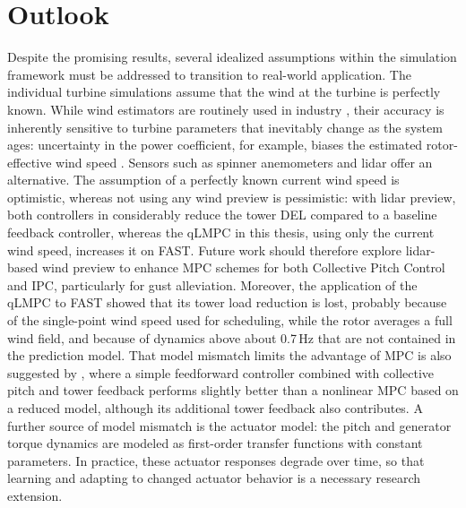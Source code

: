\section{Outlook} \label{sec:Outlook}

Despite the promising results, several idealized assumptions within the simulation framework must be addressed to transition to real-world application. The individual turbine simulations assume that the wind at the turbine is perfectly known. While wind estimators are routinely used in industry \cite{soltani2013estimation}, their accuracy is inherently sensitive to turbine parameters that inevitably change as the system ages: uncertainty in the power coefficient, for example, biases the estimated rotor-effective wind speed \cite{brandetti2022ill}. Sensors such as spinner anemometers and lidar offer an alternative. The assumption of a perfectly known current wind speed is optimistic, whereas not using any wind preview is pessimistic: with lidar preview, both controllers in \cite{schlipf2012comparison} considerably reduce the tower DEL compared to a baseline feedback controller, whereas the qLMPC in this thesis, using only the current wind speed, increases it on FAST. Future work should therefore explore lidar-based wind preview to enhance MPC schemes for both Collective Pitch Control and IPC, particularly for gust alleviation.
%
Moreover, the application of the qLMPC to FAST showed that its tower load reduction is lost, probably because of the single-point wind speed used for scheduling, while the rotor averages a full wind field, and because of dynamics above about 0.7\,Hz that are not contained in the prediction model. That model mismatch limits the advantage of MPC is also suggested by \cite{schlipf2012comparison}, where a simple feedforward controller combined with collective pitch and tower feedback performs slightly better than a nonlinear MPC based on a reduced model, although its additional tower feedback also contributes. A further source of model mismatch is the actuator model: the pitch and generator torque dynamics are modeled as first-order transfer functions with constant parameters. In practice, these actuator responses degrade over time, so that learning and adapting to changed actuator behavior is a necessary research extension. 
%
